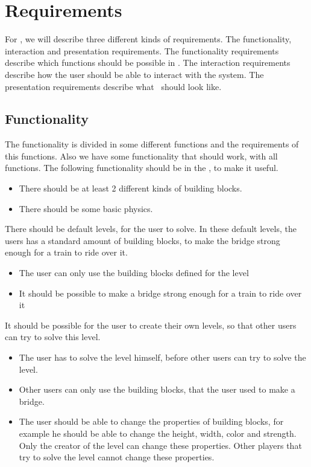 \section{Requirements}
For  \name, we will describe three different kinds of requirements. The functionality, interaction and presentation requirements. The functionality requirements describe which functions should be possible in \name. The interaction requirements describe how the user should be able to interact with the system. The presentation requirements describe what \name \ should look like. 
 \subsection{Functionality}
 The functionality is divided in some different functions and the requirements of this functions. Also we have some functionality that should work, with all functions.
 The following functionality should be in the \name, to make it useful.
  \begin{itemize}
  \item There should be at least 2 different kinds of building blocks. 
  \item There should be some basic physics.
  \end{itemize}
  There should be default levels, for the user to solve. In these default levels, the users has a standard amount of building blocks, to make the bridge strong enough for a train to ride over it. 
 \begin{itemize}
 \item The user can only use the building blocks defined for the level
 \item It should be possible to make a bridge strong enough for a train to ride over it
 \end{itemize}
  It should be possible for the user to create their own levels, so that other users can try to solve this level. 
 \begin{itemize}
 \item The user has to solve the level himself, before other users can try to solve the level.
 \item Other users can only use the building blocks, that the user used to make a bridge.
 \item The user should be able to change the properties of building blocks, for example he should be able to change the height, width, color and strength. Only the creator of the level can change these properties. Other players that try to solve the level cannot change these properties.
 \end{itemize}

